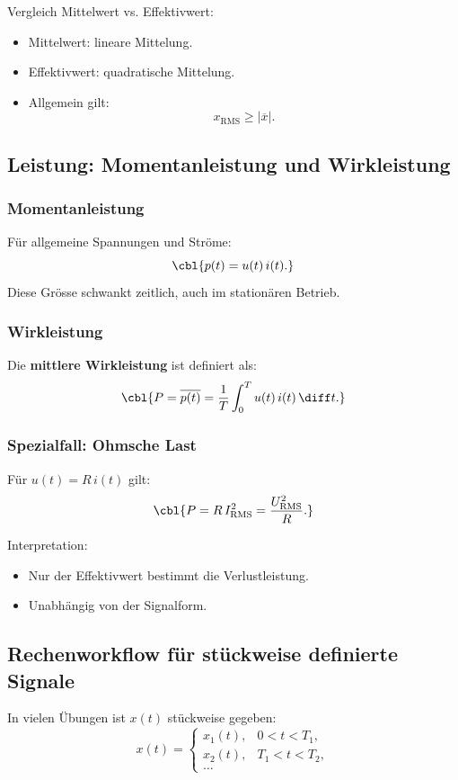Vergleich Mittelwert vs. Effektivwert:
\begin{itemize}
    \item Mittelwert: lineare Mittelung.
    \item Effektivwert: quadratische Mittelung.
    \item Allgemein gilt:
    \[
    x_{\mathrm{RMS}} \ge |\overline{x}|.
    \]
\end{itemize}

\subsection{Leistung: Momentanleistung und Wirkleistung}

\subsubsection{Momentanleistung}

Für allgemeine Spannungen und Ströme:
\[
\cbl{p(t) = u(t)\, i(t).}
\]
Diese Grösse schwankt zeitlich, auch im stationären Betrieb.

\subsubsection{Wirkleistung}

Die \textbf{mittlere Wirkleistung} ist definiert als:
\[
\cbl{P = \overline{p(t)} = \frac{1}{T} \int_{0}^{T} u(t)\,i(t)\,\diff t.}
\]

\subsubsection{Spezialfall: Ohmsche Last}

Für $u(t) = R\, i(t)$ gilt:
\[
\cbl{P = R \, I_{\mathrm{RMS}}^2 = \frac{U_{\mathrm{RMS}}^2}{R}.}
\]

Interpretation:
\begin{itemize}
    \item Nur der Effektivwert bestimmt die Verlustleistung.
    \item Unabhängig von der Signalform.
\end{itemize}

\subsection{Rechenworkflow für stückweise definierte Signale}

In vielen Übungen ist $x(t)$ stückweise gegeben:
\[
x(t) =
\begin{cases}
x_1(t), & 0 < t < T_1,\\
x_2(t), & T_1 < t < T_2,\\
\dots
\end{cases}
\]

